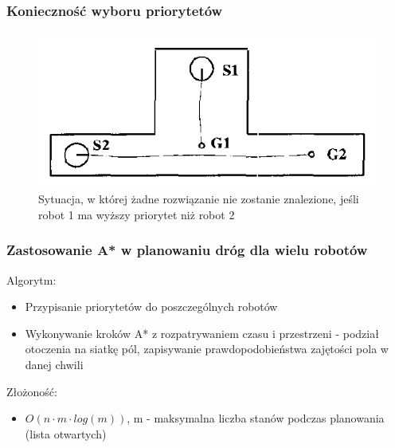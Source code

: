 \subsubsection{Konieczność wyboru priorytetów}
\begin{figure}[htp]
	\centering
	\includegraphics[width=\textwidth,height=0.4\textheight,keepaspectratio]{img/article1/fig1}
	\caption{Sytuacja, w której żadne rozwiązanie nie zostanie znalezione, jeśli robot 1 ma wyższy priorytet niż robot 2}
\end{figure}

\subsubsection{Zastosowanie A* w planowaniu dróg dla wielu robotów}
Algorytm:
\begin{itemize}
	\item Przypisanie priorytetów do poszczególnych robotów
	\item Wykonywanie kroków A* z rozpatrywaniem czasu i przestrzeni - podział otoczenia na siatkę pól, zapisywanie prawdopodobieństwa zajętości pola w danej chwili
\end{itemize}
Złożoność:
\begin{itemize}
	\item $O(n \cdot m \cdot log(m))$, m - maksymalna liczba stanów podczas planowania (lista otwartych) %
\end{itemize}

